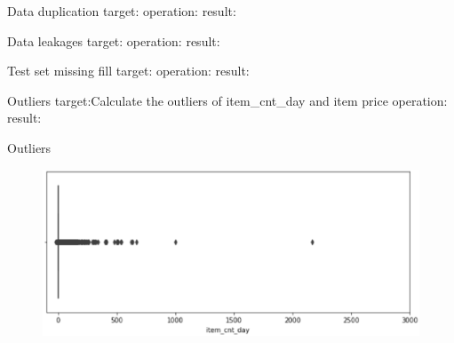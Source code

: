 \documentclass[
 size=14pt,
 paper=smartboard,  %
 mode=present, 		%
 display=slides, 	%
 style=tuliplab,  	%
 pauseslide,
 fleqn,leqno]{powerdot}
\begin{document}
\begin{slide}[toc=,bm=]{Data duplication}
  target:
  operation:
  result:
\end{slide}

\begin{slide}[toc=,bm=]{Data leakages}
  target:
  operation:
  result:
\end{slide}

\begin{slide}[toc=,bm=]{Test set missing fill}
  target:
  operation:
  result:
\end{slide}

\begin{slide}[toc=,bm=]{Outliers}
  target:Calculate the outliers of item_cnt_day and item price
  operation:
  result:
\end{slide}

\begin{slide}[toc=,bm=]{Outliers}
  \begin{figure}
    \includegraphics[scale=0.5]{picture/data_7.eps}
  \end{figure}
\end{slide}
\end{document}
